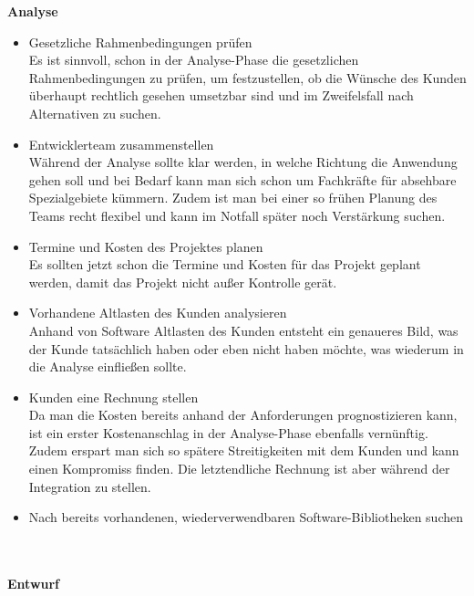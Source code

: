 \documentclass[a4paper,graphics,11pt]{article}
\begin{document}
\textbf{Analyse}
\begin{itemize}
\item Gesetzliche Rahmenbedingungen prüfen\\
Es ist sinnvoll, schon in der Analyse-Phase die gesetzlichen Rahmenbedingungen zu prüfen, um festzustellen, ob die Wünsche des Kunden überhaupt rechtlich gesehen
umsetzbar sind und im Zweifelsfall nach Alternativen zu suchen.
\item Entwicklerteam zusammenstellen \\
Während der Analyse sollte klar werden, in welche Richtung die Anwendung gehen soll und bei Bedarf kann man sich schon um Fachkräfte für absehbare Spezialgebiete
kümmern. Zudem ist man bei einer so frühen Planung des Teams recht flexibel und kann im Notfall später noch Verstärkung suchen.
\item Termine und Kosten des Projektes planen \\
Es sollten jetzt schon die Termine und Kosten für das Projekt geplant werden, damit das Projekt nicht außer Kontrolle gerät. 
\item Vorhandene Altlasten des Kunden analysieren \\
Anhand von Software Altlasten des Kunden entsteht ein genaueres Bild, was der Kunde tatsächlich haben oder eben nicht haben möchte, was wiederum in die Analyse
einfließen sollte.
\item Kunden eine Rechnung stellen \\
Da man die Kosten bereits anhand der Anforderungen prognostizieren kann, ist ein erster Kostenanschlag in der Analyse-Phase ebenfalls vernünftig. Zudem erspart man sich
so spätere Streitigkeiten mit dem Kunden und kann einen Kompromiss finden. Die letztendliche Rechnung ist aber während der Integration zu stellen.
\item Nach bereits vorhandenen, wiederverwendbaren Software-Bibliotheken suchen\\
\end{itemize} \ \\ \ \\
\textbf{Entwurf}
\end{document}

